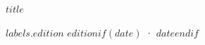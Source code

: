 \clearpage
\thispagestyle{empty}
\vspace*{\fill}
\begin{center}
{\small $title$\par}
{\small $labels.edition$ $edition$$if(date)$ · $date$$endif$\par}
\end{center}
